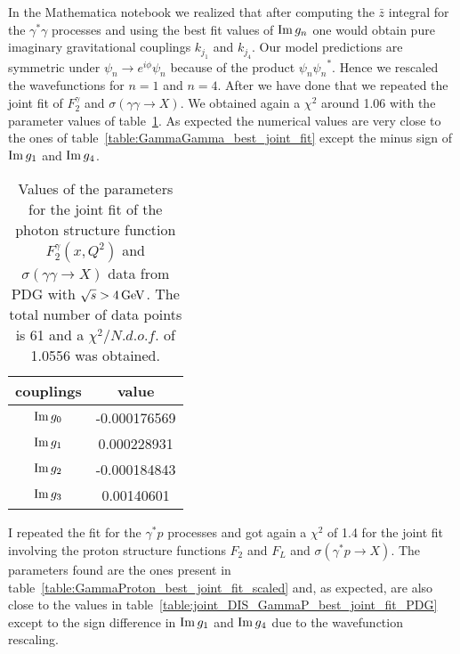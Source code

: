 \documentclass[preprint, 12pt]{elsarticle}
\begin{document}
In the Mathematica notebook we realized that after computing the $\bar{z}$ integral for the $\gamma^{*} \gamma$ processes and using the best fit values of ${\rm Im} \, g_n$ one would obtain pure imaginary gravitational couplings $k_{j_1}$ and $k_{j_4}$. Our model predictions are symmetric under $\psi_n \rightarrow e^{i\phi} \psi_n$ because of the product $\psi_n {\psi_n}^*$. Hence we rescaled the wavefunctions for $n=1$ and $n=4$. After we have done that we repeated the joint fit of $F_2^\gamma$ and $\sigma\left(\gamma \gamma \rightarrow X\right)$. We obtained again a $\chi^2$ around 1.06 with the parameter values of table~\ref{table:GammaGamma_best_joint_fit_scaled}. As expected the numerical values are very close to the ones of table~\ref{table:GammaGamma_best_joint_fit} except the minus sign of ${\rm Im} \, g_1$ and ${\rm Im} \, g_4$. 
\begin{table}[b!]
\centering
\caption{Values of the parameters for the joint fit of the photon structure function $F_2^{\gamma}\left(x, Q^2\right)$ and $\sigma\left(\gamma \gamma \rightarrow X\right)$ data from PDG with $\sqrt{s} > 4 {\rm \, GeV}$. The total number of data points is 61 and a $\chi^2 / {N.d.o.f.}$ of 1.0556 was obtained.}
\vspace{0.5cm}
\begin{tabular}{|c|c|}
\hline
couplings   & value \\
\hline
${\rm Im} \, g_0$  & -0.000176569\\ 
\hline
${\rm Im} \, g_1$  & 0.000228931 \\ 
\hline
${\rm Im} \, g_2$  & -0.000184843 \\
\hline
${\rm Im} \, g_3$  & 0.00140601 \\ 
\hline
\end{tabular}
\label{table:GammaGamma_best_joint_fit_scaled}
\end{table}
I repeated the fit for the $\gamma^{*}p$ processes and got again a $\chi^2$ of 1.4 for the joint fit involving the proton structure functions $F_2$ and $F_L$ and $\sigma\left(\gamma^* p \rightarrow X\right)$. The parameters found are the ones present in table~\ref{table:GammaProton_best_joint_fit_scaled} and, as expected, are also close to the values in table~\ref{table:joint_DIS_GammaP_best_joint_fit_PDG} except to the sign difference in ${\rm Im} \, g_1$ and ${\rm Im} \, g_4$ due to the wavefunction rescaling.
\end{document}

